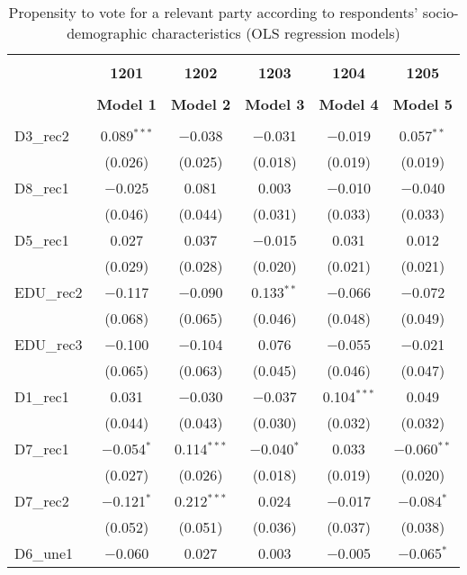 \documentclass[
]{article}
\begin{document}
\begin{table}[!htbp] \centering 
  \caption{Propensity to vote for a relevant party according to respondents'
                     socio-demographic characteristics (OLS regression models)} 
  \label{table:full_ols_el} 
\begin{tabular}{@{\extracolsep{5pt}}lccccc} 
\\[-1.8ex]\hline \\[-1.8ex] 
 & \textbf{1201} & \textbf{1202} & \textbf{1203} & \textbf{1204} & \textbf{1205} \\ 
\\[-1.8ex] & \textbf{Model 1} & \textbf{Model 2} & \textbf{Model 3} & \textbf{Model 4} & \textbf{Model 5}\\ 
\hline \\[-1.8ex] 
 D3\_rec2 & 0.089$^{***}$ & $-$0.038 & $-$0.031 & $-$0.019 & 0.057$^{**}$ \\ 
  & (0.026) & (0.025) & (0.018) & (0.019) & (0.019) \\ 
  D8\_rec1 & $-$0.025 & 0.081 & 0.003 & $-$0.010 & $-$0.040 \\ 
  & (0.046) & (0.044) & (0.031) & (0.033) & (0.033) \\ 
  D5\_rec1 & 0.027 & 0.037 & $-$0.015 & 0.031 & 0.012 \\ 
  & (0.029) & (0.028) & (0.020) & (0.021) & (0.021) \\ 
  EDU\_rec2 & $-$0.117 & $-$0.090 & 0.133$^{**}$ & $-$0.066 & $-$0.072 \\ 
  & (0.068) & (0.065) & (0.046) & (0.048) & (0.049) \\ 
  EDU\_rec3 & $-$0.100 & $-$0.104 & 0.076 & $-$0.055 & $-$0.021 \\ 
  & (0.065) & (0.063) & (0.045) & (0.046) & (0.047) \\ 
  D1\_rec1 & 0.031 & $-$0.030 & $-$0.037 & 0.104$^{***}$ & 0.049 \\ 
  & (0.044) & (0.043) & (0.030) & (0.032) & (0.032) \\ 
  D7\_rec1 & $-$0.054$^{*}$ & 0.114$^{***}$ & $-$0.040$^{*}$ & 0.033 & $-$0.060$^{**}$ \\ 
  & (0.027) & (0.026) & (0.018) & (0.019) & (0.020) \\ 
  D7\_rec2 & $-$0.121$^{*}$ & 0.212$^{***}$ & 0.024 & $-$0.017 & $-$0.084$^{*}$ \\ 
  & (0.052) & (0.051) & (0.036) & (0.037) & (0.038) \\ 
  D6\_une1 & $-$0.060 & 0.027 & 0.003 & $-$0.005 & $-$0.065$^{*}$ \\ 

\end{tabular}
\end{table}
\end{document}
